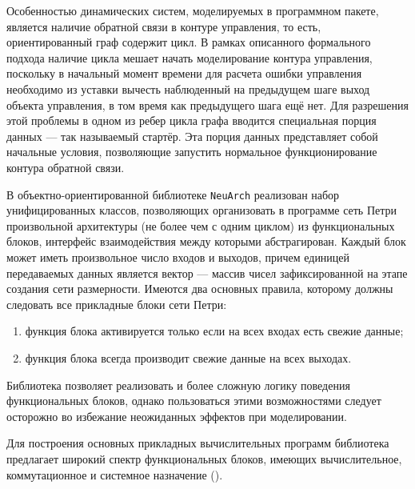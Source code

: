 Особенностью динамических систем, моделируемых в программном пакете,
является наличие обратной связи в контуре управления, то есть,
ориентированный граф содержит цикл.  В рамках описанного формального
подхода наличие цикла мешает начать моделирование контура управления,
поскольку в начальный момент времени для расчета ошибки управления
необходимо из уставки вычесть наблюденный на предыдущем шаге выход
объекта управления, в том время как предыдущего шага ещё нет.  Для
разрешения этой проблемы в одном из ребер цикла графа вводится
специальная порция данных --- так называемый стартёр.  Эта порция
данных представляет собой начальные условия, позволяющие запустить
нормальное функционирование контура обратной связи.

В объектно-ориентированной библиотеке {\tt NeuArch} реализован набор
унифицированных классов, позволяющих организовать в программе сеть
Петри произвольной архитектуры (не более чем с одним циклом) из
функциональных блоков, интерфейс взаимодействия между которыми
абстрагирован.  Каждый блок может иметь произвольное число входов и
выходов, причем единицей передаваемых данных является вектор ---
массив чисел зафиксированной на этапе создания сети размерности.
Имеются два основных правила, которому должны следовать все прикладные
блоки сети Петри:
\begin{enumerate}
\item функция блока активируется только если на всех входах есть
  свежие данные;
\item функция блока всегда производит свежие данные на всех выходах.
\end{enumerate}

Библиотека позволяет реализовать и более сложную логику поведения
функциональных блоков, однако пользоваться этими возможностями следует
осторожно во избежание неожиданных эффектов при моделировании.


Для построения основных прикладных вычислительных программ библиотека
предлагает широкий спектр функциональных блоков, имеющих
вычислительное, коммутационное и системное назначение
().

